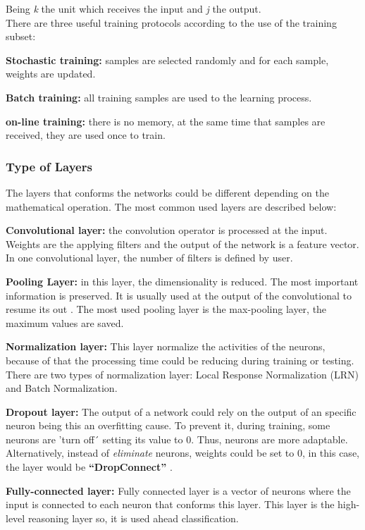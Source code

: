 Being \textit{k} the unit which receives the input and \textit{j} the output.\\

There are three useful training protocols according to the use of the training subset:
\begin{description}[itemsep=2pt,topsep=8pt,parsep=0pt,partopsep=20pt]
	\item \textbf{Stochastic training:} samples are selected randomly and for each sample, weights are updated.
	 \item \textbf{Batch training:} all training samples are used to the learning process.
	 \item \textbf{on-line training:} there is no memory, at the same time that samples are received, they are used once to train.
\end{description}

\subsubsection{Type of Layers}
The layers that conforms the networks could be different depending on the mathematical operation. The most common used layers are described below:
\begin{description}[itemsep=2pt,topsep=8pt,parsep=0pt,partopsep=20pt]
	\item \textbf{Convolutional layer:} the convolution operator is processed at the input. Weights are the applying filters and the output of the network is a feature vector. In one convolutional layer, the number of filters is defined by user.
	\item \textbf{Pooling Layer:} in this layer, the dimensionality is reduced. The most important information is preserved. It is usually used at the output of the convolutional to resume its out \cite{Doorn}. The most used pooling layer is the max-pooling layer, the maximum values are saved.
	\item \textbf{Normalization layer:} This layer normalize the activities of the neurons, because of that the processing time could be reducing during training or testing. There are two types of normalization layer: Local Response Normalization (LRN) and Batch Normalization.
	\item \textbf{Dropout layer:} The output of a network could rely on the output of an specific neuron being this an overfitting cause. To prevent it, during training, some neurons are 'turn off´ setting its value to 0. Thus, neurons are more adaptable. Alternatively, instead of \textit{eliminate} neurons,  weights could be set to 0, in this case, the layer would be \textbf{``DropConnect''} \cite{Doorn}.
	\item  \textbf{Fully-connected layer:} Fully connected layer is a vector of neurons where the input is connected to each neuron that conforms this layer. This layer is the high-level reasoning layer so, it is used ahead classification.
\end{description}

